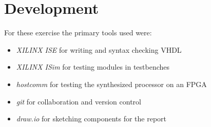 \section{Development}
For these exercise the primary tools used were:
\begin{itemize}
    \item   \textit{XILINX ISE} for writing and syntax checking VHDL
    \item   \textit{XILINX ISim} for testing modules in testbenches
    \item   \textit{hostcomm}\cite{bib:hostcomm} for testing the synthesized processor on an FPGA
    \item   \textit{git} for collaboration and version control
    \item   \textit{draw.io} for sketching components for the report
\end{itemize}

